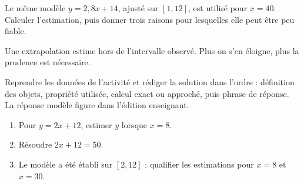 \begin{activite}
Le même modèle $y=2{,}8x+14$, ajusté sur $[1,12]$, est utilisé pour $x=40$. Calculer l'estimation, puis donner trois raisons pour lesquelles elle peut être peu fiable.
\begin{center}\end{center}
\end{activite}

\begin{traceecrite}Une extrapolation estime hors de l'intervalle observé. Plus on s'en éloigne, plus la prudence est nécessaire.\end{traceecrite}

\begin{exemple}
Reprendre les données de l'activité et rédiger la solution dans l'ordre : définition des objets, propriété utilisée, calcul exact ou approché, puis phrase de réponse. La réponse modèle figure dans l'édition enseignant.
\end{exemple}

\begin{exercice}[-- essentiel]
\begin{enumerate}\item Pour $y=2x+12$, estimer $y$ lorsque $x=8$.\item Résoudre $2x+12=50$.\item Le modèle a été établi sur $[2,12]$ : qualifier les estimations pour $x=8$ et $x=30$.\end{enumerate}
\end{exercice}


